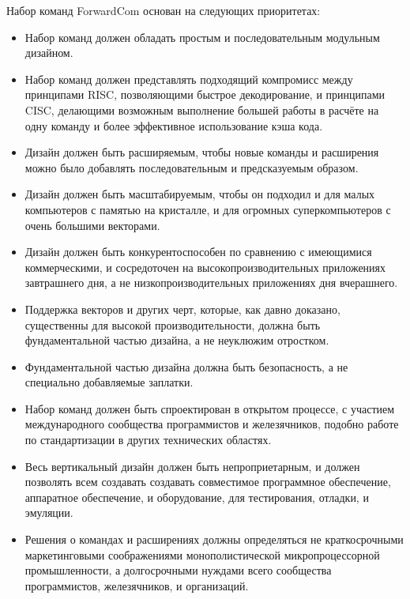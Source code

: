 \documentclass[forwardcom.tex]{subfiles}
\begin{document}
Набор команд ForwardCom основан на следующих приоритетах:
\begin{itemize}
\item Набор команд должен обладать простым и последовательным модульным дизайном.

\item Набор команд должен представлять подходящий компромисс между принципами RISC, позволяющими быстрое декодирование, и принципами CISC, делающими
возможным выполнение большей работы в расчёте на одну команду и более эффективное использование кэша кода.

\item Дизайн должен быть расширяемым, чтобы новые команды и расширения можно было добавлять последовательным и предсказуемым образом. 

\item Дизайн должен быть масштабируемым, чтобы он подходил и для малых компьютеров с памятью на кристалле, и для огромных суперкомпьютеров с очень большими векторами.

\item Дизайн должен быть конкурентоспособен по сравнению с имеющимися коммерческими, и сосредоточен на высокопроизводительных приложениях завтрашнего дня, а не низкопроизводительных приложениях дня вчерашнего.

\item Поддержка векторов и других черт, которые, как давно доказано, существенны для высокой производительности, должна быть фундаментальной частью дизайна, а не неуклюжим отростком.

\item Фундаментальной частью дизайна должна быть безопасность, а не специально добавляемые заплатки.

\item Набор команд должен быть спроектирован в открытом процессе, с участием международного сообщества программистов и \glqq железячников\grqq, подобно работе по стандартизации в других технических областях.

\item Весь вертикальный дизайн должен быть непроприетарным, и должен позволять всем создавать создавать совместимое программное обеспечение, аппаратное обеспечение, и оборудование, для тестирования, отладки, и эмуляции.

\item Решения о командах и расширениях должны определяться не краткосрочными маркетинговыми соображениями монополистической микропроцессорной промышленности, а долгосрочными нуждами всего сообщества программистов, \glqq железячников\grqq, и организаций. 


\end{itemize}
\end{document}
